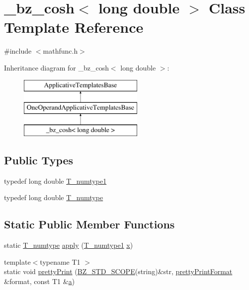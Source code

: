 \hypertarget{class__bz__cosh_3_01long_01double_01_4}{}\section{\+\_\+bz\+\_\+cosh$<$ long double $>$ Class Template Reference}
\label{class__bz__cosh_3_01long_01double_01_4}


{\ttfamily \#include $<$mathfunc.\+h$>$}

Inheritance diagram for \+\_\+bz\+\_\+cosh$<$ long double $>$\+:\begin{figure}[H]
\begin{center}
\leavevmode
\includegraphics[height=3.000000cm]{class__bz__cosh_3_01long_01double_01_4}
\end{center}
\end{figure}
\subsection*{Public Types}
\begin{DoxyCompactItemize}
\item 
typedef long double \hyperlink{class__bz__cosh_3_01long_01double_01_4_af16e962bfed9f353175a4f66709cdd84}{T\+\_\+numtype1}
\item 
typedef long double \hyperlink{class__bz__cosh_3_01long_01double_01_4_a080ed19cc75f1fe19261560133d75850}{T\+\_\+numtype}
\end{DoxyCompactItemize}
\subsection*{Static Public Member Functions}
\begin{DoxyCompactItemize}
\item 
static \hyperlink{class__bz__cosh_3_01long_01double_01_4_a080ed19cc75f1fe19261560133d75850}{T\+\_\+numtype} \hyperlink{class__bz__cosh_3_01long_01double_01_4_ab89f01e190d3d751f6434f3f4242d23a}{apply} (\hyperlink{class__bz__cosh_3_01long_01double_01_4_af16e962bfed9f353175a4f66709cdd84}{T\+\_\+numtype1} \hyperlink{vecnorm1_8cc_ac73eed9e41ec09d58f112f06c2d6cb63}{x})
\item 
{\footnotesize template$<$typename T1 $>$ }\\static void \hyperlink{class__bz__cosh_3_01long_01double_01_4_a7ba9cae0077c7d0149dcc1b69295a186}{pretty\+Print} (\hyperlink{numinquire_8h_a2b24ffc3b4ef9803956bc7715c6c7b83}{B\+Z\+\_\+\+S\+T\+D\+\_\+\+S\+C\+O\+P\+E}(string)\&str, \hyperlink{classprettyPrintFormat}{pretty\+Print\+Format} \&format, const T1 \&\hyperlink{gen__mat5files_8m_aae328bf20413f220e38aec4d95bfd6da}{a})
\end{DoxyCompactItemize}


